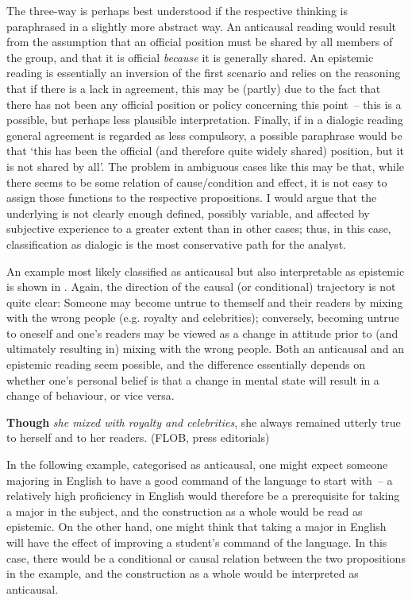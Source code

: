The three-way  is perhaps best understood if the respective thinking is paraphrased in a slightly more abstract way. An anticausal reading would result from the assumption that an official position must be shared by all members of the group, and that it is official \textit{because} it is generally shared. An epistemic reading is essentially an inversion of the first scenario and relies on the reasoning that if there is a lack in agreement, this may be (partly) due to the fact that there has not been any official position or policy concerning this point~– this is a possible, but perhaps less plausible interpretation. Finally, if in a dialogic reading general agreement is regarded as less compulsory, a possible paraphrase would be that ‘this has been the official (and therefore quite widely shared) position, but it is not shared by all’. The problem in ambiguous cases like this may be that, while there seems to be some relation of cause/condition and effect, it is not easy to assign those functions to the respective propositions. I would argue that the underlying  is not clearly enough defined, possibly variable, and affected by subjective experience to a greater extent than in other cases; thus, in this case, classification as dialogic is the most conservative path for the analyst.

An example most likely classified as anticausal but also interpretable as epistemic is shown in . Again, the direction of the causal (or conditional) trajectory is not quite clear: Someone may become untrue to themself and their readers by mixing with the wrong people (e.g. royalty and celebrities); conversely, becoming untrue to oneself and one’s readers may be viewed as a change in attitude prior to (and ultimately resulting in) mixing with the wrong people. Both an anticausal and an epistemic reading seem possible, and the difference essentially depends on whether one’s personal belief is that a change in mental state will result in a change of behaviour, or vice versa.

\ea\label{ex:63}\label{bkm:Ref488064831}\textbf{Though} \textit{she mixed with royalty and celebrities}, she always remained utterly true to herself and to her readers. (FLOB, press editorials)
\z

In the following example, categorised as anticausal, one might expect someone majoring in English to have a good command of the language to start with~– a relatively high proficiency in English would therefore be a prerequisite for taking a major in the subject, and the construction as a whole would be read as epistemic. On the other hand, one might think that taking a major in English will have the effect of improving a student’s command of the language. In this case, there would be a conditional or causal relation between the two propositions in the example, and the construction as a whole would be interpreted as anticausal.

